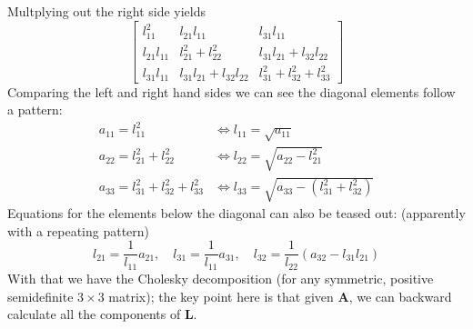 \documentclass{report}
\begin{document}
Multplying out the right side yields
\begin{equation*}
\begin{bmatrix}
l_{11}^2&l_{21}l_{11}&l_{31}l_{11}\\
l_{21}l_{11}&l_{21}^2+l_{22}^2&l_{31}l_{21}+l_{32}l_{22}\\
l_{31}l_{11}&l_{31}l_{21}+l_{32}l_{22}&l_{31}^2
+l_{32}^2+l_{33}^2
\end{bmatrix}
\end{equation*}
Comparing the left and right hand sides we can see the diagonal elements follow a pattern:
\begin{align*}
a_{11}=l_{11}^2&\iff l_{11}=\sqrt{a_{11}}\\
a_{22}=l_{21}^2+l_{22}^2&\iff l_{22}=\sqrt{a_{22}-l_{21}^2}\\
a_{33}=l_{31}^2+l_{32}^2+l_{33}^2&\iff l_{33}=\sqrt{a_{33}-(l_{31}^2+l_{32}^2)}
\end{align*}
Equations for the elements below the diagonal can also be teased out: (apparently with a repeating pattern)
\begin{equation*}
l_{21}=\frac{1}{l_{11}}a_{21},\quad l_{31}=\frac{1}{l_{11}}a_{31},\quad l_{32}=\frac{1}{l_{22}}(a_{32}-l_{31}l_{21})
\end{equation*}
With that we have the Cholesky decomposition (for any symmetric, positive semidefinite $3\times3$ matrix); the 
key point here is that given $\bm{A}$, we can backward calculate all the components of $\bm{L}$.
\newpage
\end{document}

